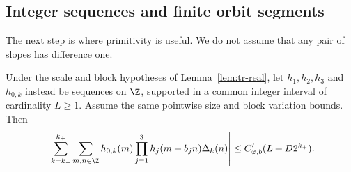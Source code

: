 \subsection{Integer sequences and finite orbit segments}

The next step is where primitivity is useful.  We do not assume that
any pair of slopes has difference one.

\begin{lemma}
\label{lem:tr-integer}
Under the scale and block hypotheses of Lemma~\ref{lem:tr-real},
let \(h_1,h_2,h_3\) and \(h_{0,k}\) instead be sequences on \(\Z\),
supported in a common integer interval of cardinality \(L\geq1\).
Assume the same pointwise size and block variation bounds.  Then
\begin{equation}
 \left|\sum_{k=k_-}^{k_+}\sum_{m,n\in\Z}
 h_{0,k}(m)\prod_{j=1}^3h_j(m+b_jn)\Delta_k(n)\right|
 \leq C'_{\varphi,b}(L+D2^{k_+}).
 \label{eq:tr-integer}
\end{equation}
\end{lemma}

